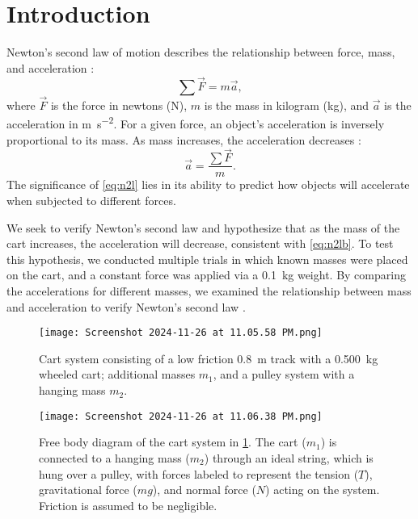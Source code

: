 ﻿\documentclass[reprint,amsmath,amssymb,aps]{revtex4-2}
\begin{document}
\section{Introduction}
Newton’s second law of motion describes the relationship between force, mass, and acceleration \cite{knight2017physics}: 
\begin{equation}
\sum \vec{F} = m \vec{a},
\label{eq:n2l}
\end{equation}
where $\vec{F}$ is the force in newtons (\unit{\newton}), $m$ is the mass in kilogram (\unit{\kilo\gram}), and $\vec{a}$ is the acceleration in \unit{\meter\per\second\squared}. For a given force, an object’s acceleration is inversely proportional to its mass. As mass increases, the acceleration decreases \cite{knight2017physics}:   
\begin{equation}
\vec{a} = \dfrac{\sum \vec{F}}{m}.
\label{eq:n2lb}
\end{equation}
The significance of \cref{eq:n2l} lies in its ability to predict how objects will accelerate when subjected to different forces. 

We seek to verify Newton’s second law and hypothesize that as the mass of the cart increases, the acceleration will decrease, consistent with \cref{eq:n2lb}. To test this hypothesis, we conducted multiple trials in which known masses were placed on the cart, and a constant force was applied via a \qty{0.1}{\kilo\gram} weight. By comparing the accelerations for different masses, we examined the relationship between mass and acceleration to verify Newton’s second law \cite{knight2017physics}.

\begin{figure}
\begin{center}
\texttt{[image: Screenshot 2024-11-26 at 11.05.58 PM.png]}
\end{center}
\caption{\label{fig:materials} Cart system consisting of a low friction \qty{0.8}{\meter} track with a \qty{0.500}{\kilo\gram} wheeled cart; additional masses $m_1$, and a pulley system with a hanging mass $m_2$.}
\end{figure}

\begin{figure}
\begin{center}
\texttt{[image: Screenshot 2024-11-26 at 11.06.38 PM.png]}
\end{center}
\caption{\label{fig:fbd} Free body diagram of the cart system in \cref{fig:materials}. The cart ($m_1$) is connected to a hanging mass ($m_2$) through an ideal string, which is hung over a pulley, with forces labeled to represent the tension ($T$), gravitational force ($mg$), and normal force ($N$) acting on the system. Friction is assumed to be negligible.}
\end{figure}
\end{document}
